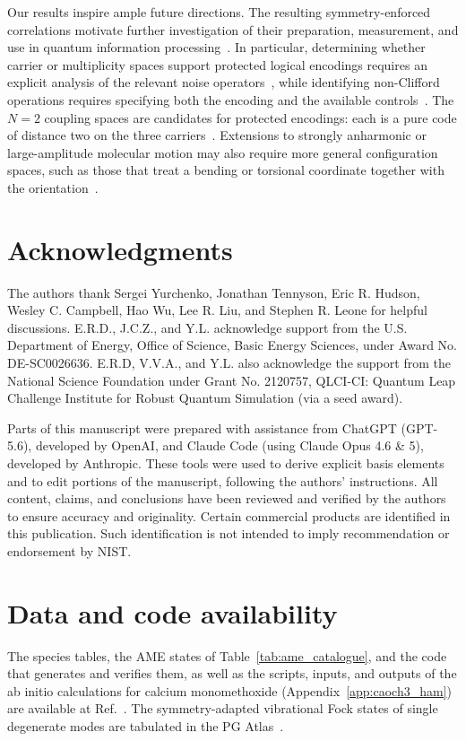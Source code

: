 \documentclass[
  reprint,
  aps,
  prx,
  superscriptaddress,
  amsmath,
  amssymb,
  longbibliography
]{revtex4-2}
\DeclareRobustCommand{\pgatlasfont}[1]{{\fontencoding{OT1}\fontfamily{cmss}\fontshape{n}\selectfont#1}}
\newcommand{\PGAtlas}{\pgatlasfont{PG Atlas}}
\begin{document}
Our results inspire ample future directions. The resulting symmetry-enforced correlations motivate further investigation of their preparation, measurement, and use in quantum information processing~\cite{PRXQuantum.5.040336, PRXQuantum.5.030310, SciPostPhys.19.1.020, Zeppenfeld2023, Ding2023, Ding2023Corrigendum, Low2025}. In particular, determining whether carrier or multiplicity spaces support protected logical encodings requires an explicit analysis of the relevant noise operators~\cite{Xu_2024, johnson2026symmetryprotectedquantumcomputingusing, Jain2024, Zhong2016, Stickler2018}, while identifying non-Clifford operations requires specifying both the encoding and the available controls~\cite{luo2026hybridqubitrotorquantumsystems}. The $N=2$ coupling spaces are candidates for protected encodings: each is a pure code of distance two on the three carriers~\cite{DasRepo2026}. Extensions to strongly anharmonic or large-amplitude molecular motion may also require more general configuration spaces, such as those that treat a bending or torsional coordinate together with the orientation~\cite{HougenBunkerJohns1970, BunkerJensen2006}.


\section*{Acknowledgments}

The authors thank Sergei Yurchenko, Jonathan Tennyson, Eric R. Hudson, Wesley C. Campbell, Hao Wu, Lee R. Liu, and Stephen R. Leone for helpful discussions. E.R.D., J.C.Z., and Y.L. acknowledge support from the U.S. Department of Energy, Office of Science, Basic Energy Sciences, under Award No. DE-SC0026636. E.R.D, V.V.A., and Y.L. also acknowledge the support from the National Science Foundation under Grant No. 2120757, QLCI-CI: Quantum Leap Challenge Institute for Robust Quantum Simulation (via a seed award).

Parts of this manuscript were prepared with assistance from ChatGPT (GPT-5.6), developed by OpenAI, and Claude Code (using Claude Opus 4.6 \& 5), developed by Anthropic. These tools were used to derive explicit basis elements and to edit portions of the manuscript, following the authors’ instructions. 
All content, claims, and conclusions have been reviewed and verified by the authors to ensure accuracy and originality.
Certain commercial products are identified in this publication. Such identification is not intended to imply recommendation or endorsement by NIST.

\section*{Data and code availability}
The species tables, the AME states of Table~\ref{tab:ame_catalogue}, and the code that generates and verifies them, as well as the scripts, inputs, and outputs of the ab initio calculations for calcium monomethoxide (Appendix~\ref{app:caoch3_ham}) are available at Ref.~\cite{DasRepo2026}. The symmetry-adapted vibrational Fock states of single degenerate modes are tabulated in the \PGAtlas~\cite{o3harmonics}. 
\end{document}
